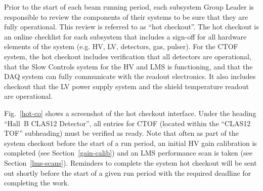 \documentclass[12pt]{article}
\begin{document}
Prior to the start of each beam running period, each subsystem Group Leader is 
responsible to review the components of their systems to be sure that they are 
fully operational. This review is referred to as ``hot checkout''. The hot checkout 
is an online checklist for each subsystem that includes a sign-off for all hardware 
elements of the system (e.g. HV, LV, detectors, gas, pulser). For the CTOF system, 
the hot checkout includes verification that all detectors are operational, that the 
Slow Controls system for the HV and LMS is functioning, and that the DAQ system can 
fully communicate with the readout electronics. It also includes checkout that the 
LV power supply system and the shield temperature readout are operational. 

Fig.~\ref{hot-co} shows a screenshot of the hot checkout interface. Under the heading 
``Hall~B CLAS12 Detector'', all entries for CTOF (located within the ``CLAS12 TOF''
subheading) must be verified as ready. Note that often as part of the system checkout 
before the start of a run period, an initial HV gain calibration is completed (see 
Section~\ref{gain-calib}) and an LMS performance scan is taken (see 
Section~\ref{lms-scans}). Reminders to complete the system hot checkout will be sent 
out shortly before the start of a given run period with the required deadline for 
completing the work.
\end{document}
